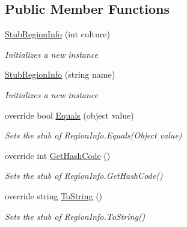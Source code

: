 \subsection*{Public Member Functions}
\begin{DoxyCompactItemize}
\item 
\hyperlink{class_system_1_1_globalization_1_1_fakes_1_1_stub_region_info_a17e469d1995dd6a12ecd87f40482c1a6}{Stub\-Region\-Info} (int culture)
\begin{DoxyCompactList}\small\item\em Initializes a new instance\end{DoxyCompactList}\item 
\hyperlink{class_system_1_1_globalization_1_1_fakes_1_1_stub_region_info_acef7bbddb8c9dac93a024ffa095b4633}{Stub\-Region\-Info} (string name)
\begin{DoxyCompactList}\small\item\em Initializes a new instance\end{DoxyCompactList}\item 
override bool \hyperlink{class_system_1_1_globalization_1_1_fakes_1_1_stub_region_info_acfc69655de4130b9263b6203194523aa}{Equals} (object value)
\begin{DoxyCompactList}\small\item\em Sets the stub of Region\-Info.\-Equals(\-Object value)\end{DoxyCompactList}\item 
override int \hyperlink{class_system_1_1_globalization_1_1_fakes_1_1_stub_region_info_a0f2223eeb55049fcdde38652fcba5286}{Get\-Hash\-Code} ()
\begin{DoxyCompactList}\small\item\em Sets the stub of Region\-Info.\-Get\-Hash\-Code()\end{DoxyCompactList}\item 
override string \hyperlink{class_system_1_1_globalization_1_1_fakes_1_1_stub_region_info_ab26794045e563cffdf98ab678c8eb57f}{To\-String} ()
\begin{DoxyCompactList}\small\item\em Sets the stub of Region\-Info.\-To\-String()\end{DoxyCompactList}\end{DoxyCompactItemize}
